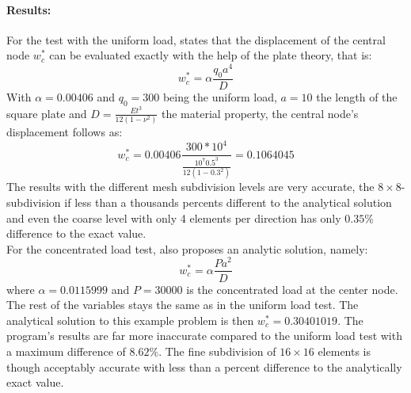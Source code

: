   \paragraph{Results:} For the test with the uniform load, \cite{jin1994analysis} states that the displacement of the central node $w_c^*$ can be evaluated exactly with the help of the plate theory, that is:
  \begin{equation}\label{eq:test-WC*q}
  w_c^* = \alpha \frac{q_0 a^4}{D}
  \end{equation}
  With $\alpha = 0.00406$ and $q_0 = 300$ being the uniform load, $a = 10$ the length of the square plate and $D = \frac{E t^3}{12 (1-\nu^2)}$ the material property, the central node's displacement follows as:
  \begin{equation*}
  w_c^* = 0.00406 \frac{300 * 10^4}{\frac{10^7 0.5^3}{12(1-0.3^2)}} = 0.1064045
  \end{equation*}
  The results with the different mesh subdivision levels are very accurate, the $8\!\times\!8$-subdivision if less than a thousands percents different to the analytical solution and even the coarse level with only 4 elements per direction has only $0.35\%$ difference to the exact value.\\
  For the concentrated load test, \cite{jin1994analysis} also proposes an analytic solution, namely:
  \begin{equation}\label{eq:test-WC*P}
  w_c^* = \alpha \frac{P a^2}{D}
  \end{equation}
  where $\alpha = 0.0115999$ and $P = 30000$ is the concentrated load at the center node. The rest of the variables stays the same as in the uniform load test. The analytical solution to this example problem is then $
  w_c^* = 0.30401019$. The program's results are far more inaccurate compared to the uniform load test with a maximum difference of $8.62\%$. The fine subdivision of $16\!\times\!16$ elements is though acceptably accurate with less than a percent difference to the analytically exact value.
